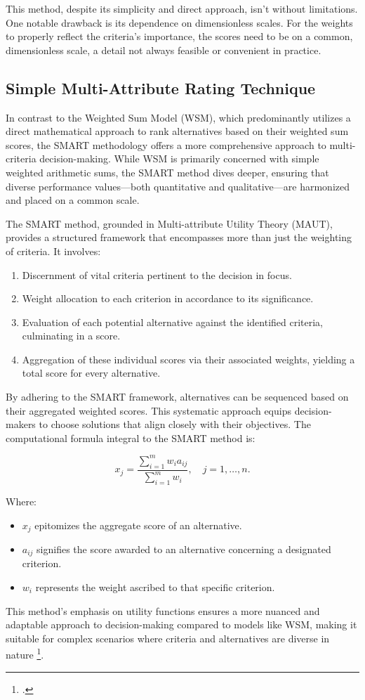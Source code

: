 This method, despite its simplicity and direct approach, isn't without limitations. One notable drawback is its dependence on dimensionless scales. For the weights to properly reflect the criteria's importance, the scores need to be on a common, dimensionless scale, a detail not always feasible or convenient in practice.

\subsection{Simple Multi-Attribute Rating Technique}

In contrast to the Weighted Sum Model (WSM), which predominantly utilizes a
direct mathematical approach to rank alternatives based on their weighted sum
scores, the \ac{SMART} methodology offers a more comprehensive approach to
multi-criteria decision-making. While WSM is primarily concerned with simple
weighted arithmetic sums, the SMART method dives deeper, ensuring that diverse
performance values—both quantitative and qualitative—are harmonized and placed
on a common scale.

The SMART method, grounded in Multi-attribute Utility Theory (MAUT), provides a
structured framework that encompasses more than just the weighting of criteria.
It involves:

\begin{enumerate} \item Discernment of vital criteria pertinent to the decision
in focus. \item Weight allocation to each criterion in accordance to its
significance. \item Evaluation of each potential alternative against the
identified criteria, culminating in a score. \item Aggregation of these
individual scores via their associated weights, yielding a total score for every
alternative. \end{enumerate}

By adhering to the SMART framework, alternatives can be sequenced based on
their aggregated weighted scores. This systematic approach equips
decision-makers to choose solutions that align closely with their objectives.
The computational formula integral to the SMART method is:

\[ x_j = \frac{\sum_{i=1}^{m} w_i a_{ij}}{\sum_{i=1}^{m} w_i}, \quad j = 1, \ldots, n. \]

Where:
\begin{itemize}
    \item \( x_j \) epitomizes the aggregate score of an alternative.
    \item \( a_{ij} \) signifies the score awarded to an alternative concerning a designated criterion.
    \item \( w_i \) represents the weight ascribed to that specific criterion.
\end{itemize}

This method's emphasis on utility functions ensures a more nuanced and adaptable
approach to decision-making compared to models like WSM, making it suitable for
complex scenarios where criteria and alternatives are diverse in nature \footcite[p. 6]{fulopIntroductionDecisionMaking2005}.